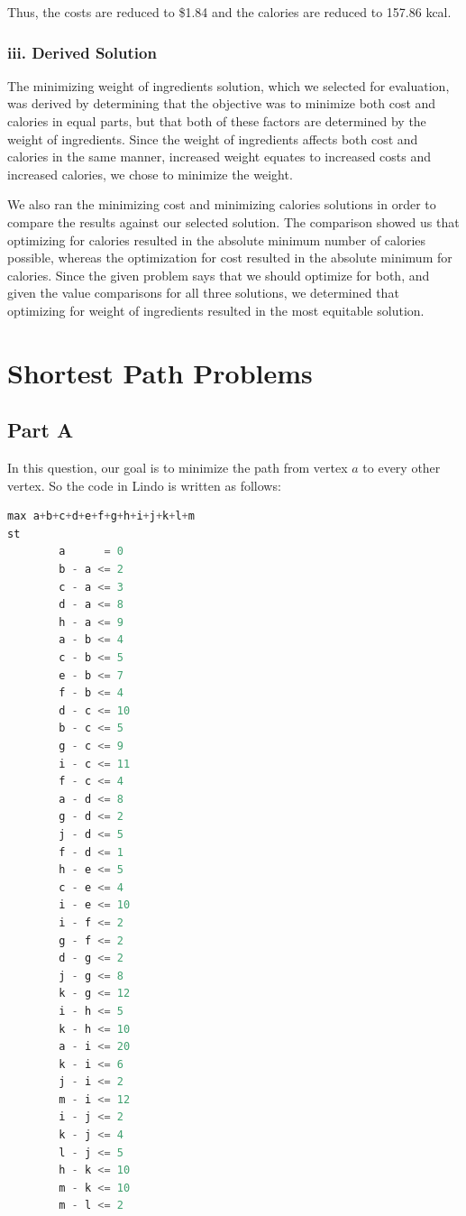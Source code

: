 \documentclass[11pt]{scrreprt}
\begin{document}
Thus, the costs are reduced to \$1.84 and the calories are reduced to 157.86 kcal.

\subsection{iii. Derived Solution}
The minimizing weight of ingredients solution, which we selected for evaluation, was derived by determining that the objective was to minimize both cost and calories in equal parts, but that both of these factors are determined by the weight of ingredients. Since the weight of ingredients affects both cost and calories in the same manner, increased weight equates to increased costs and increased calories, we chose to minimize the weight.

We also ran the minimizing cost and minimizing calories solutions in order to compare the results against our selected solution. The comparison showed us that optimizing for calories resulted in the absolute minimum number of calories possible, whereas the optimization for cost resulted in the absolute minimum for calories. Since the given problem says that we should optimize for both, and given the value comparisons for all three solutions, we determined that optimizing for weight of ingredients resulted in the most equitable solution.

\chapter{Shortest Path Problems}

\section{Part A}\label{part3a}
In this question, our goal is to minimize the path from vertex $a$ to every other vertex. So the code in Lindo is written as follows:
\begin{lstlisting}[language=c]
max a+b+c+d+e+f+g+h+i+j+k+l+m
st
        a      = 0 
        b - a <= 2
        c - a <= 3
        d - a <= 8
        h - a <= 9
        a - b <= 4
        c - b <= 5
        e - b <= 7
        f - b <= 4
        d - c <= 10
        b - c <= 5
        g - c <= 9
        i - c <= 11
        f - c <= 4
        a - d <= 8
        g - d <= 2
        j - d <= 5
        f - d <= 1
        h - e <= 5
        c - e <= 4
        i - e <= 10
        i - f <= 2
        g - f <= 2
        d - g <= 2
        j - g <= 8
        k - g <= 12
        i - h <= 5
        k - h <= 10
        a - i <= 20
        k - i <= 6
        j - i <= 2
        m - i <= 12
        i - j <= 2
        k - j <= 4
        l - j <= 5
        h - k <= 10
        m - k <= 10
        m - l <= 2
\end{lstlisting}
\end{document}
